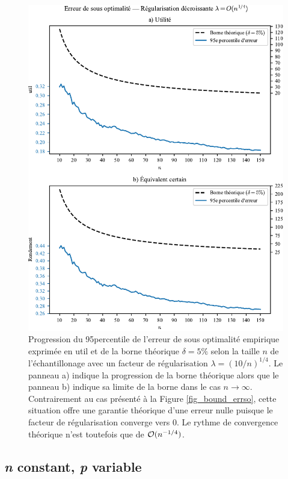 \begin{figure}[h!]
  \centering \includegraphics[width=\textwidth]{../experiments/fig/bound_errso3.pdf}
  \caption[Erreur de sous optimalité en fonction de $n$
  ($\lambda=\bigO(n^{-1/4})$)]{Progression du 95\ieme percentile de l'erreur de sous optimalité
    empirique exprimée en util et de la borne théorique $\delta=5\%$ selon la taille $n$ de
    l'échantillonage avec un facteur de régularisation $\lambda = (10/n)^{1/4}$. Le panneau a)
    indique la progression de la borne théorique alors que le panneau b) indique sa limite
    de la borne dans le cas $n\to\infty$. Contrairement au cas présenté à la Figure
    \ref{fig_bound_errso}, cette situation offre une garantie théorique d'une erreur nulle
    puisque le facteur de régularisation converge vers 0. Le rythme de convergence
    théorique n'est toutefois que de $\mathcal O(n^{-1/4})$.}
  \label{fig_bound_errso3}
\end{figure}


\clearpage

\subsection{\textit{n} constant, \textit{p} variable}
\label{emp:pvar}

